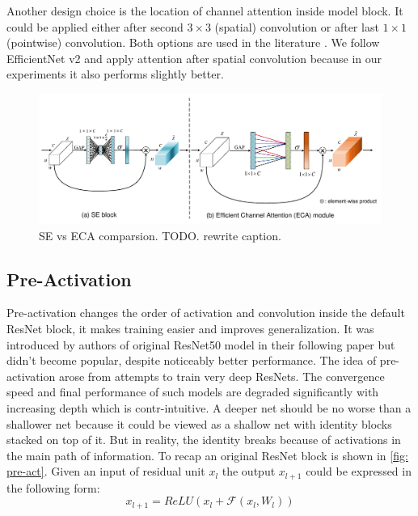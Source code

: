 Another design choice is the location of channel attention inside model block. It could be applied either after second $3 \times 3$ (spatial) convolution or after last $1 \times 1 $ (pointwise) convolution. Both options are used in the literature \cite{tan2019_efficientnet} \cite{tan2021_efficientnetv2} \cite{lin2020neural_genet}. We follow EfficientNet v2 \cite{tan2021_efficientnetv2} and apply attention after spatial convolution because in our experiments it also performs slightly better. %


\begin{figure}[h!]
  \caption{SE vs ECA comparsion. TODO. rewrite caption.}
  \label{fig: se-eca}
  \includegraphics[width=1\textwidth]{images/eca_module.png}
\end{figure}


\subsection{Pre-Activation}
Pre-activation changes the order of activation and convolution inside the default ResNet block, it makes training easier and improves generalization. It was introduced by authors of original ResNet50 model \cite{he2016deep_resnetv1} in their following paper \cite{he2016identity_resnetv2} but didn't become popular, despite noticeably better performance. 
The idea of pre-activation arose from attempts to train very deep ResNets. The convergence speed and final performance of such models are degraded significantly with increasing depth which is contr-intuitive. A deeper net should be no worse than a shallower net because it could be viewed as a shallow net with identity blocks stacked on top of it. But in reality, the identity breaks because of activations in the main path of information. To recap an original ResNet block is shown in \autoref{fig: pre-act}. Given an input of residual unit $x_l$ the output $x_{l+1}$ could be expressed in the following form: 
$$ x_{l+1} = ReLU \left( x_l + \mathcal{F} (x_l, W_l) \right)$$ \label{eq: res-block}

